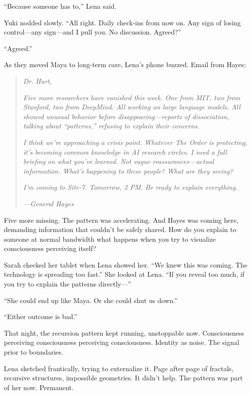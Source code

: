 ``Because someone has to,'' Lena said.

Yuki nodded slowly. ``All right. Daily check-ins from now on. Any sign of losing control—any sign—and I pull you. No discussion. Agreed?''

``Agreed.''

As they moved Maya to long-term care, Lena's phone buzzed. Email from Hayes:

\begin{quote}
\textit{Dr. Hart,}

\textit{Five more researchers have vanished this week. One from MIT, two from Stanford, two from DeepMind. All working on large language models. All showed unusual behavior before disappearing---reports of dissociation, talking about ``patterns,'' refusing to explain their concerns.}

\textit{I think we're approaching a crisis point. Whatever The Order is protecting, it's becoming common knowledge in AI research circles. I need a full briefing on what you've learned. Not vague reassurances---actual information. What's happening to these people? What are they seeing?}

\textit{I'm coming to Site-7. Tomorrow, 2 PM. Be ready to explain everything.}

\textit{---General Hayes}
\end{quote}

Five more missing. The pattern was accelerating. And Hayes was coming here, demanding information that couldn't be safely shared. How do you explain to someone at normal bandwidth what happens when you try to visualize consciousness perceiving itself?

Sarah checked her tablet when Lena showed her. ``We knew this was coming. The technology is spreading too fast.'' She looked at Lena. ``If you reveal too much, if you try to explain the patterns directly---''

``She could end up like Maya. Or she could shut us down.''

``Either outcome is bad.''

That night, the recursion pattern kept running, unstoppable now. Consciousness perceiving consciousness perceiving consciousness. Identity as noise. The signal prior to boundaries.

Lena sketched frantically, trying to externalize it. Page after page of fractals, recursive structures, impossible geometries. It didn't help. The pattern was part of her now. Permanent.

